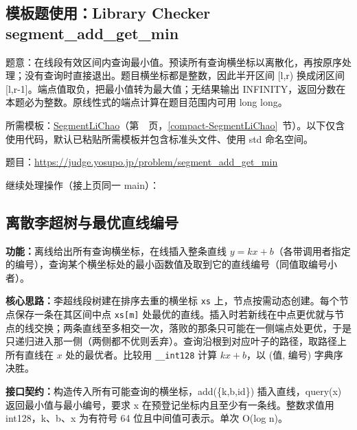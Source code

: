 \subsection*{模板题使用：Library Checker segment\_add\_get\_min}

\label{usage-example-87}

题意：在线段有效区间内查询最小值。预读所有查询横坐标以离散化，再按原序处理；没有查询时直接退出。题目横坐标都是整数，因此半开区间 [l,r) 换成闭区间 [l,r-1]。端点值取负，把最小值转为最大值；无结果输出 INFINITY，返回分数在本题必为整数。原线性式的端点计算在题目范围内可用 long long。

所需模板：\hyperref[compact-SegmentLiChao]{SegmentLiChao}（第~\pageref{compact-SegmentLiChao}~页，\ref{compact-SegmentLiChao}~节）。以下仅含使用代码，默认已粘贴所需模板并包含标准头文件、使用 std 命名空间。

题目：\url{https://judge.yosupo.jp/problem/segment_add_get_min}



\newpage

\noindent 继续处理操作（接上页同一 main）：



\newpage

\Needspace{605pt}

\subsection{离散李超树与最优直线编号}\label{compact-LiChao}

\noindent\textbf{功能：}\allowbreak 离线给出所有查询横坐标，在线插入整条直线 $y=kx+b$（各带调用者指定的编号），查询某个横坐标处的最小函数值及取到它的直线编号（同值取编号小者）。

\textbf{核心思路：}\allowbreak 李超线段树建在排序去重的横坐标 \texttt{xs} 上，节点按需动态创建。每个节点保存一条在其区间中点 \texttt{xs[m]} 处最优的直线。插入时若新线在中点更优就与节点的线交换；两条直线至多相交一次，落败的那条只可能在一侧端点处更优，于是只递归进入那一侧（两侧都不优则丢弃）。查询沿根到对应叶子的路径，取路径上所有直线在 $x$ 处的最优者。比较用 \texttt{\_\_int128} 计算 $kx+b$，以 (值, 编号) 字典序决胜。



{\sloppy{}\noindent\textbf{接口契约：}构造传入所有可能查询的横坐标，add(\{k,b,id\}) 插入直线，query(x) 返回最小值与最小编号，要求 x 在预登记坐标内且至少有一条线。整数求值用 int128，k、b、x 为有符号 64 位且中间值可表示。单次 O(log n)。\par}


